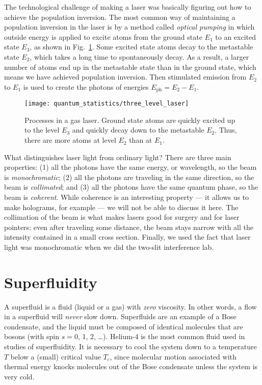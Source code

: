 The technological challenge of making a laser was basically figuring
out how to achieve the population inversion.  The most common way of
maintaining a population inversion in the laser is by a method called
{\it optical pumping} in which outside energy is applied to excite
atoms from the ground state $E_1$ to an excited state $E_3$, as shown
in Fig.~\ref{fig:three_level_laser}.  Some excited state atoms decay
to the metastable state $E_2$, which takes a long time to
spontaneously decay.  As a result, a larger number of atoms end up in
the metastable state than in the ground state, which means we have
achieved population inversion.  Then stimulated emission from $E_2$ to
$E_1$ is used to create the photons of energies $E_\text{ph}=E_2 -
E_1$.

\begin{figure}
\begin{center}
\texttt{[image: quantum\_statistics/three\_level\_laser]}
\caption{Processes in a gas laser.  Ground state atoms are quickly
  excited up to the level $E_3$ and quickly decay down to the
  metastable $E_2$.  Thus, there are more atoms at level $E_2$ than at
  $E_1$.}
\label{fig:three_level_laser}
\end{center}
\end{figure}

What distinguishes laser light from ordinary light?  There are three
main properties: (1) all the photons have the same energy, or
wavelength, so the beam is \textit{monochromatic}; (2) all the photons
are traveling in the same direction, so the beam is
\textit{collimated}; and (3) all the photons have the same quantum
phase, so the beam is \textit{coherent}.  While coherence is an
interesting property --- it allows us to make holograms, for example
--- we will not be able to discuss it here.  The collimation of the
beam is what makes lasers good for surgery and for laser pointers:
even after traveling some distance, the beam stays narrow with all
the intensity contained in a small cross section.  Finally, we used the fact
that laser light was monochromatic when we did the two-slit interference
lab.

\section{Superfluidity}

A superfluid is a fluid (liquid or a gas) with {\em zero} viscosity.
In other words, a flow in a superfluid will {\em never} slow down.
Superfluids are an example of a Bose condensate, and the liquid must
be composed of identical molecules that are bosons (with spin $s = 0$,
1, 2, \dots).  Helium-4 is the most common fluid used in studies of
superfluidity.  It is necessary to cool the system down to a
temperature $T$ below a (small) critical value $T_c$, since molecular
motion associated with thermal energy knocks molecules out of the Bose
condensate unless the system is very cold.

